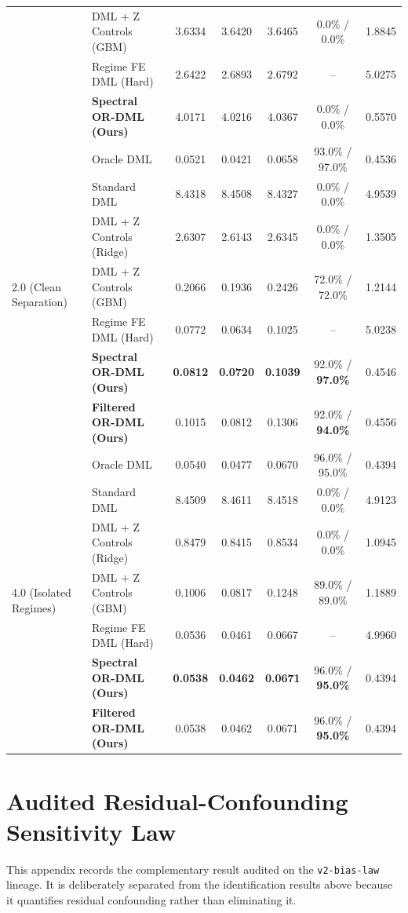 \documentclass[twoside]{article}
\theoremstyle{definition}
\begin{document}
\begin{table}[t]
{\begin{tabular}{llccccc}
& DML + Z Controls (GBM) & 3.6334 & 3.6420 & 3.6465 & 0.0\% / 0.0\% & 1.8845 \\
& Regime FE DML (Hard) & 2.6422 & 2.6893 & 2.6792 & -- & 5.0275 \\
& \textbf{Spectral OR-DML (Ours)} & 4.0171 & 4.0216 & 4.0367 & 0.0\% / 0.0\% & 0.5570 \\
\midrule
\multirow{7}{*}{2.0 (Clean Separation)} 
& Oracle DML & 0.0521 & 0.0421 & 0.0658 & 93.0\% / 97.0\% & 0.4536 \\
& Standard DML & 8.4318 & 8.4508 & 8.4327 & 0.0\% / 0.0\% & 4.9539 \\
& DML + Z Controls (Ridge) & 2.6307 & 2.6143 & 2.6345 & 0.0\% / 0.0\% & 1.3505 \\
& DML + Z Controls (GBM) & 0.2066 & 0.1936 & 0.2426 & 72.0\% / 72.0\% & 1.2144 \\
& Regime FE DML (Hard) & 0.0772 & 0.0634 & 0.1025 & -- & 5.0238 \\
& \textbf{Spectral OR-DML (Ours)} & \textbf{0.0812} & \textbf{0.0720} & \textbf{0.1039} & 92.0\% / \textbf{97.0\%} & 0.4546 \\
& \textbf{Filtered OR-DML (Ours)} & 0.1015 & 0.0812 & 0.1306 & 92.0\% / \textbf{94.0\%} & 0.4556 \\
\midrule
\multirow{7}{*}{4.0 (Isolated Regimes)} 
& Oracle DML & 0.0540 & 0.0477 & 0.0670 & 96.0\% / 95.0\% & 0.4394 \\
& Standard DML & 8.4509 & 8.4611 & 8.4518 & 0.0\% / 0.0\% & 4.9123 \\
& DML + Z Controls (Ridge) & 0.8479 & 0.8415 & 0.8534 & 0.0\% / 0.0\% & 1.0945 \\
& DML + Z Controls (GBM) & 0.1006 & 0.0817 & 0.1248 & 89.0\% / 89.0\% & 1.1889 \\
& Regime FE DML (Hard) & 0.0536 & 0.0461 & 0.0667 & -- & 4.9960 \\
& \textbf{Spectral OR-DML (Ours)} & \textbf{0.0538} & \textbf{0.0462} & \textbf{0.0671} & 96.0\% / \textbf{95.0\%} & 0.4394 \\
& \textbf{Filtered OR-DML (Ours)} & 0.0538 & 0.0462 & 0.0671 & 96.0\% / \textbf{95.0\%} & 0.4394 \\
\bottomrule
\end{tabular}%
}
\vspace{-2.5mm}
\end{table}

\section{Audited Residual-Confounding Sensitivity Law}
\label{app:biaslaw}
This appendix records the complementary result audited on the \texttt{v2-bias-law} lineage. It is deliberately separated from the identification results above because it quantifies residual confounding rather than eliminating it.
\end{document}
